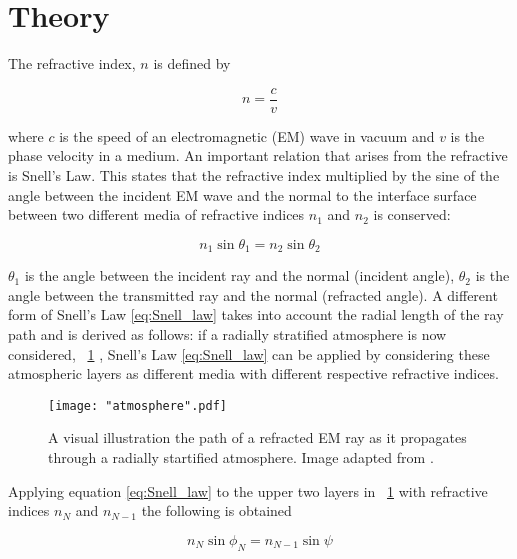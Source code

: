 \documentclass{article}
\newcommand{\figref}[2][\figurename~]{#1\ref{#2}}
\begin{document}
\section{Theory}
\label{sec:theory}

The refractive index, $n$ is defined by

\begin{equation}
\label{eq:ref_index}
n = \frac{c}{v}
\end{equation}

\vspace{2mm}
\noindent
where $c$ is the speed of an electromagnetic (EM) wave in vacuum and $v$ is the phase velocity in a medium. An important relation that arises from the refractive is Snell's Law. This states that the refractive index multiplied by the sine of the angle between the incident EM wave and the normal to the interface surface between two different media of refractive indices $n_1$ and $n_2$ is conserved:

\begin{equation}
\label{eq:Snell_law}
n_1\sin{\theta_1} = n_2\sin{\theta_2}
\end{equation}

\vspace{2mm}
\noindent
$\theta_1$ is the angle between the incident ray and the normal (incident angle), $\theta_2$ is the angle between the transmitted ray and the normal (refracted angle). A different form of Snell's Law \eqref{eq:Snell_law} takes into account the radial length of the ray path and is derived as follows: if a radially stratified atmosphere is now considered, \figref{fig:atmosphere} \cite{Paper02}, Snell's Law \eqref{eq:Snell_law} can be applied by considering these atmospheric layers as different media with different respective refractive indices.

\begin{figure}[h]
\centering
\texttt{[image: "atmosphere".pdf]}
\caption{A visual illustration the path of a refracted EM ray as it propagates through a radially startified atmosphere. Image adapted from \cite{Paper02}.}
\label{fig:atmosphere}
\end{figure}

\vspace{2mm}
\noindent
Applying equation \eqref{eq:Snell_law} to the upper two layers in \figref{fig:atmosphere} with refractive indices $n_N$ and $n_{N-1}$ the following is obtained

\begin{equation}
\label{eq:Snell_law2}
n_N\sin{\phi_N} = n_{N-1}\sin{\psi}
\end{equation}
\end{document}
